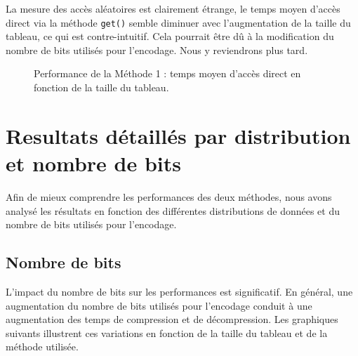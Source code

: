 \documentclass{rapportClass} %
\begin{document}
La mesure des accès aléatoires est clairement étrange, le temps moyen d'accès direct via la méthode \texttt{get()}
semble diminuer avec l'augmentation de la taille du tableau, ce qui est contre-intuitif.  
Cela pourrait être dû à la modification du nombre de bits utilisés pour l'encodage. Nous y reviendrons plus tard.
\begin{figure}[H]
    \centering
    \caption{Performance de la Méthode 1 : temps moyen d’accès direct en fonction de la taille du tableau.}
    \label{fig:global_get_times}
\end{figure}

\section{Resultats détaillés par distribution et nombre de bits}
Afin de mieux comprendre les performances des deux méthodes, nous avons analysé les résultats
en fonction des différentes distributions de données et du nombre de bits utilisés pour l’encodage.  
\subsection{Nombre de bits}

L'impact du nombre de bits sur les performances est significatif. En général, une augmentation du nombre de bits
utilisés pour l'encodage conduit à une augmentation des temps de compression et de décompression.
Les graphiques suivants illustrent ces variations en fonction de la taille du tableau et de la méthode utilisée.
\end{document}
